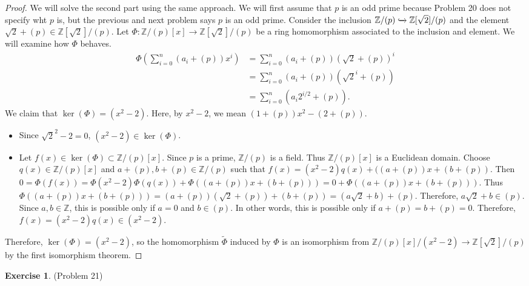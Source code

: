 \documentclass[12pt, psamsfonts]{amsart}
\theoremstyle{definition}
\newtheorem*{exer}{Exercise}
\theoremstyle{remark}
\numberwithin{equation}{section}
\begin{document}
\begin{proof}
  We will solve the second part using the same approach.
  We will first assume that $p$ is an odd prime because Problem 20 does not specify wht $p$ is, but the previous and next problem says $p$ is an odd prime.
  Consider the inclusion $\mathbb{Z}/(p) \xhookrightarrow{} \mathbb{Z}[\sqrt{2}]/(p)$ and the element $\sqrt{2} + (p) \in \mathbb{Z}[\sqrt{2}]/(p)$.
  Let $\Phi: \mathbb{Z}/(p)[x] \rightarrow \mathbb{Z}[\sqrt{2}]/(p)$ be a ring homomorphism associated to the inclusion and element.
  We will examine how $\Phi$ behaves.
  \begin{align*}
    \Phi(\sum_{i=0}^{n}(a_i + (p))x^i)
      &= \sum_{i=0}^{n}(a_i + (p))(\sqrt{2} + (p))^i \\
      &= \sum_{i=0}^{n}(a_i + (p))(\sqrt{2}^i + (p)) \\
      &= \sum_{i=0}^{n}(a_i 2^{i/2} + (p)).
  \end{align*}
  We claim that $\ker(\Phi) = (x^2 - 2)$.
  Here, by $x^2 - 2$, we mean $(1 + (p))x^2 - (2 + (p))$.
  \begin{itemize}
    \item
      Since $\sqrt{2}^2 - 2 = 0$, $(x^2 - 2) \in \ker(\Phi)$.
    \item
      Let $f(x) \in \ker(\Phi) \subset \mathbb{Z}/(p)[x]$.
      Since $p$ is a prime, $\mathbb{Z}/(p)$ is a field.
      Thus $\mathbb{Z}/(p)[x]$ is a Euclidean domain.
      Choose $q(x) \in \mathbb{Z}/(p)[x]$ and $a + (p), b + (p) \in \mathbb{Z}/(p)$ such that $f(x) = (x^2 - 2)q(x) + ((a + (p))x + (b + (p))$.
      Then $0 = \Phi(f(x)) = \Phi(x^2 - 2)\Phi(q(x)) + \Phi((a + (p))x + (b + (p))) = 0 + \Phi((a + (p))x + (b + (p)))$.
      Thus $\Phi((a + (p))x + (b + (p))) = (a + (p))(\sqrt{2} + (p)) + (b + (p)) = (a\sqrt{2} + b) + (p)$.
      Therefore, $a\sqrt{2} + b \in (p)$.
      Since $a, b \in \mathbb{Z}$, this is possible only if $a = 0$ and $b \in (p)$.
      In other words, this is possible only if $a + (p) = b + (p) = 0$.
      Therefore, $f(x) = (x^2 - 2)q(x) \in (x^2 - 2)$.
  \end{itemize}
  Therefore, $\ker(\Phi) = (x^2 - 2)$, so the homomorphism $\tilde{\Phi}$ induced by $\Phi$ is an isomorphism from $\mathbb{Z}/(p)[x]/(x^2 - 2) \rightarrow \mathbb{Z}[\sqrt{2}]/(p)$ by the first isomorphism theorem.
\end{proof}

\begin{exer}{(Problem 21)}
  \todo[inline]{
  }
\end{exer}
\end{document}
